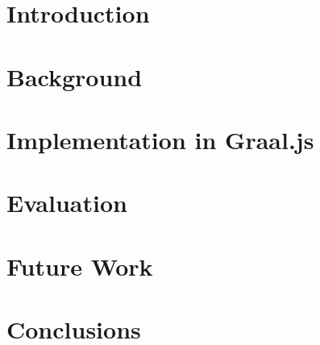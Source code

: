 
\chapter{Introduction}



\chapter{Background}



\chapter{Implementation in Graal.js}



\chapter{Evaluation}



\chapter{Future Work}



\chapter{Conclusions}

